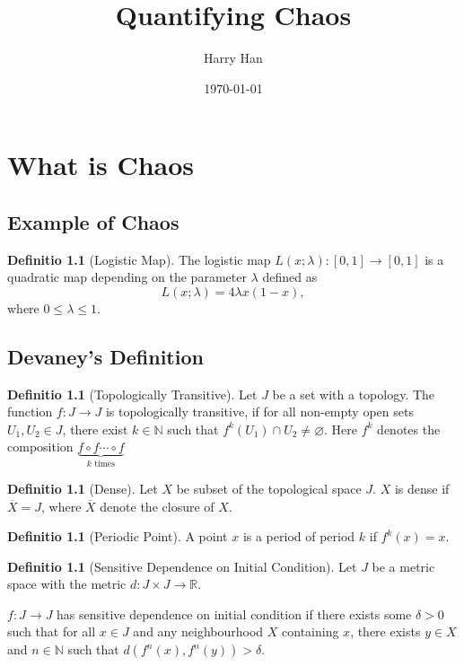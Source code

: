 \documentclass{report}
\title{Quantifying Chaos}
\author{Harry Han}
\date{\today}
\theoremstyle{definition}
\newtheorem{defn}[thm]{Definitio}
\theoremstyle{definition}
\theoremstyle{remark}
\newcommand{\bb}[1]{\mathbb{#1}} %
\begin{document}
\maketitle
\tableofcontents
\chapter{What is Chaos}

\section{Example of Chaos}

\begin{defn}[Logistic Map]
	The logistic map $L(x; \lambda): [0,1] \rightarrow [0,1]$ is a quadratic map depending on the parameter $\lambda$ defined as 
	\begin{equation} \label{logistic_map}
		L(x; \lambda) = 4\lambda x(1 -x ),
	\end{equation}
	where $0\leq \lambda \leq 1$.
\end{defn}

\section{Devaney's Definition}

\begin{defn}[Topologically Transitive]
	Let $J$ be a set with a topology.
	The function $f: J \rightarrow J$ is topologically transitive, if for all non-empty open sets $U_1, U_2 \in J$, there exist $k \in \bb{N}$ such that $f^k(U_1) \cap U_2 \neq \varnothing$. 
	Here $f^k$ denotes the composition $\underbrace{f \circ f \cdots \circ f}_{k \text{ times}}$
\end{defn}

\begin{defn}[Dense]
	Let $X$ be subset of the topological space $J$. 
	$X$ is dense if $\overline{X} = J$, where $\overline{X}$ denote the closure of $X$.
\end{defn}

\begin{defn}[Periodic Point]
	A point $x$ is a period of period $k$ if $f^k(x)=x$.
\end{defn}

\begin{defn}[Sensitive Dependence on Initial Condition]
	Let $J$ be a metric space with the metric $d: J \times J \rightarrow \bb{R}$.

	$f: J \rightarrow J$ has sensitive dependence on initial condition if there exists some $\delta > 0$ such that for all $x \in J$ and any neighbourhood $X$ containing $x$, there exists $y \in X$ and $n \in \bb{N}$ such that $d(f^n(x), f^n(y)) > \delta$.
\end{defn}
\end{document}
